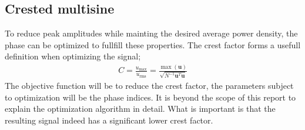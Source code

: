 \subsection{Crested multisine}
To reduce peak amplitudes while mainting the desired average power density, the phase can be optimized to fullfill these properties. The crest factor forms a usefull definition when optimizing the signal;
\begin{align}
    C = \frac{u_\textrm{max}}{u_\textrm{rms}} = \frac{\max(\mathbf{u})}{\sqrt{N^{-1}\mathbf{u}^T\mathbf{u}}}
\end{align}
The objective function will be to reduce the crest factor, the parameters subject to optimization will be the phase indices. It is beyond the scope of this report to explain the optimization algorithm in detail. What is important is that the resulting signal indeed has a significant lower crest factor. 
